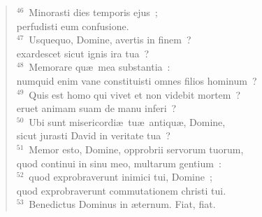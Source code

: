 \begin{flushleft}
\begin{verse}
${}^{46}$~Minorasti dies temporis ejus~;\\ perfudisti eum confusione.\\
${}^{47}$~Usquequo, Domine, avertis in finem~?\\ exardescet sicut ignis ira tua~?\\
${}^{48}$~Memorare qu\ae\ mea substantia~:\\ numquid enim vane constituisti omnes filios hominum~?\\
${}^{49}$~Quis est homo qui vivet et non videbit mortem~?\\ eruet animam suam de manu inferi~?\\
${}^{50}$~Ubi sunt misericordi\ae\ tu\ae\ antiqu\ae , Domine,\\ sicut jurasti David in veritate tua~?\\
${}^{51}$~Memor esto, Domine, opprobrii servorum tuorum,\\ quod continui in sinu meo, multarum gentium~:\\
${}^{52}$~quod exprobraverunt inimici tui, Domine~;\\ quod exprobraverunt commutationem christi tui.\\
${}^{53}$~Benedictus Dominus in \ae ternum. Fiat, fiat.\end{verse}\end{flushleft}



